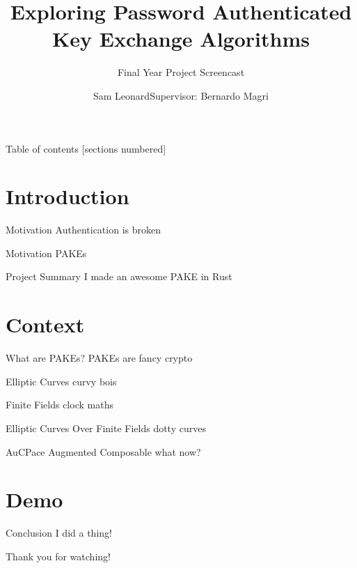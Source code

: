 \documentclass[hyperref={pdfpagemode=FullScreen}, aspectratio=169, 10pt]{beamer}
\title{Exploring Password Authenticated Key Exchange Algorithms}
\subtitle{Final Year Project Screencast}
\author{\texorpdfstring{Sam Leonard\newline Supervisor: Bernardo Magri}{Sam Leonard}}
\date{}
\begin{document}
\maketitle

\begin{frame}{Table of contents}
  [sections numbered]
  \tableofcontents%
\end{frame}

\section[Intro]{Introduction}

\begin{frame}{Motivation}
  Authentication is broken
\end{frame}

\begin{frame}{Motivation}
  PAKEs 
\end{frame}

\begin{frame}{Project Summary}
  I made an awesome PAKE in Rust
\end{frame}

\section{Context}

\begin{frame}{What are PAKEs?}
  PAKEs are fancy crypto
\end{frame}

\begin{frame}{Elliptic Curves}
  curvy bois
\end{frame}

\begin{frame}{Finite Fields}
  clock maths
\end{frame}

\begin{frame}{Elliptic Curves Over Finite Fields}
  dotty curves
\end{frame}

\begin{frame}{AuCPace}
  Augmented Composable what now?
\end{frame}

\section{Demo}

\begin{frame}{Conclusion}
  I did a thing!
\end{frame}

\begin{frame}[standout]
  Thank you for watching!
\end{frame}
\end{document}
